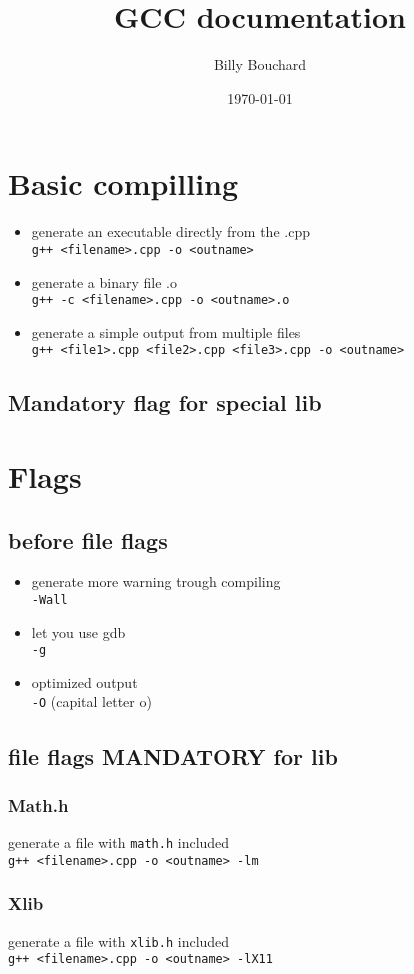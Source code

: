 \documentclass[12pt]{article}
\author{Billy Bouchard}
\title{GCC documentation}
\date{\today}
\begin{document}
\maketitle
\tableofcontents
\newpage
\section{Basic compilling}
\begin{itemize}
	\item generate an executable directly from the .cpp \\ \verb|g++ <filename>.cpp -o <outname>|
	\item generate a binary file .o \\ \verb|g++ -c <filename>.cpp -o <outname>.o|
	\item generate a simple output from multiple files \\ \verb|g++ <file1>.cpp <file2>.cpp <file3>.cpp -o <outname>|
\end{itemize}
\subsection{Mandatory flag for special lib}
\begin{itemize}
\end{itemize}
\newpage
\section{Flags}
\subsection{before file flags}
\begin{itemize}
	\item generate more warning trough compiling \\ \verb|-Wall|
	\item let you use gdb \\ \verb|-g|
	\item optimized output \\ \verb|-O| (capital letter o)
\end{itemize}
\subsection{file flags MANDATORY for lib}
\subsubsection{Math.h}
generate a file with \verb|math.h| included \\ \verb|g++ <filename>.cpp -o <outname> -lm|
\subsubsection{Xlib}
generate a file with \verb|xlib.h| included \\ \verb|g++ <filename>.cpp -o <outname> -lX11|
\end{document}
